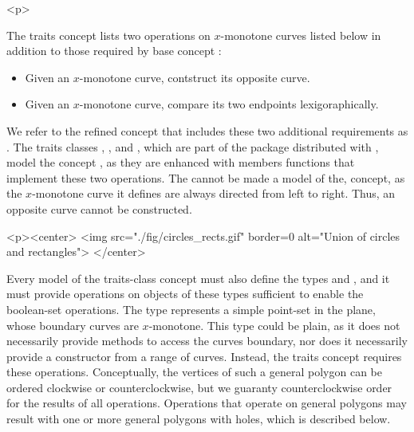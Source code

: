 \begin{ccHtmlOnly}<p>\end{ccHtmlOnly}
The traits concept lists two operations on $x$-monotone curves listed below
in addition to those required by base concept 
:
\begin{itemize}
\item Given an $x$-monotone curve, contstruct its opposite curve.
\item Given an $x$-monotone curve, compare its two endpoints lexigoraphically.
\end{itemize}
We refer to the refined concept that includes these two additional 
requirements as . The traits 
classes , , 
and , which are part of the  
package distributed with \cgal, model the concept 
, as they are enhanced with members
functions that implement these two operations.
The  cannot be made a model of the, 
 concept, as the
$x$-monotone curve it defines are always directed from left to right. Thus, an
opposite curve cannot be constructed.

\begin{ccHtmlOnly}
  <p><center>
    <img src="./fig/circles_rects.gif" border=0 alt="Union of circles
    and rectangles">
  </center>
\end{ccHtmlOnly}
Every model of the traits-class concept must also define the types
 and , and it
must provide operations on objects of these types sufficient to enable
the boolean-set operations.  The type  represents a
simple point-set in the plane, whose boundary curves are $x$-monotone.
This type could be plain, as it does not necessarily provide methods
to access the curves boundary, nor does it necessarily provide a
constructor from a range of curves. Instead, the traits concept
requires these operations. Conceptually, the vertices of such a
general polygon can be ordered clockwise or counterclockwise, but we
guaranty counterclockwise order for the results of all
operations. Operations that operate on general polygons may result
with one or more general polygons with holes, which is described
below.

